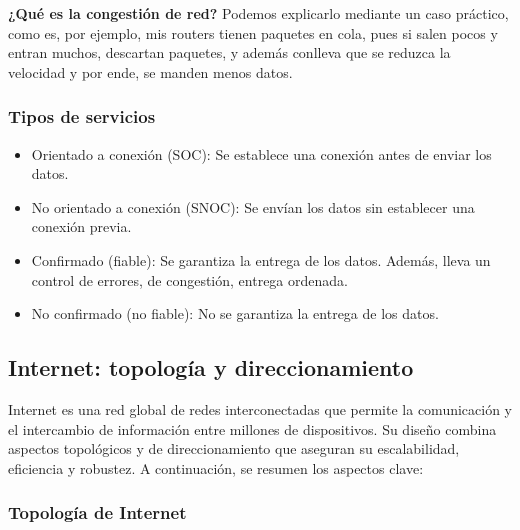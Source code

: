 \documentclass[a4paper,12pt]{article}
\begin{document}
\begin{tcolorbox}[colback=green!5!white, colframe=blue!75!black, title=Pregunta de Examen]
    \textbf{¿Qué es la congestión de red?} Podemos explicarlo mediante un caso práctico, como es, por ejemplo, mis routers tienen paquetes en cola, pues si salen pocos y entran muchos, descartan paquetes, y además conlleva que se reduzca la velocidad y por ende, se manden menos datos.   
    
\end{tcolorbox}

\subsubsection{Tipos de servicios}

\begin{itemize}
    \item Orientado a conexión (SOC): Se establece una conexión antes de enviar los datos.
    \item No orientado a conexión (SNOC): Se envían los datos sin establecer una conexión previa.
\end{itemize}

\begin{itemize}
    \item Confirmado (fiable): Se garantiza la entrega de los datos. Además, lleva un control de errores, de congestión, entrega ordenada.
    \item No confirmado (no fiable): No se garantiza la entrega de los datos.
\end{itemize}

\subsection{Internet: topología y direccionamiento}

Internet es una red global de redes interconectadas que permite la comunicación y el intercambio de información entre millones de dispositivos. Su diseño combina aspectos topológicos y de direccionamiento que aseguran su escalabilidad, eficiencia y robustez. A continuación, se resumen los aspectos clave:

\subsubsection{Topología de Internet}
\end{document}
